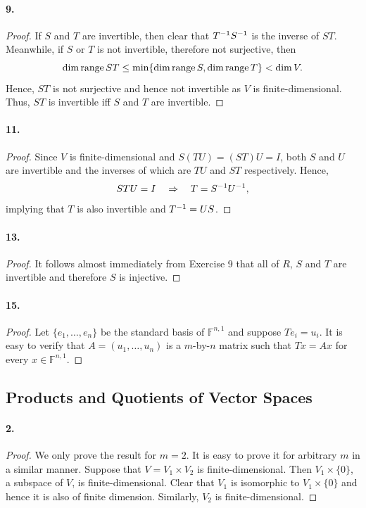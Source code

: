   \paragraph{9.}
  \begin{proof}
    If $S$ and $T$ are invertible, then clear that $T^{-1} S^{-1}$ is the inverse
    of $ST$. Meanwhile, if $S$ or $T$ is not invertible, therefore not 
    surjective, then 
    \[
      \dim\operatorname{range} ST\le\min\{\dim\operatorname{range} S,\dim\operatorname{range} T\}<\dim V.
    \]
    Hence, $ST$ is not surjective and hence not invertible as $V$ is 
    finite-dimensional. Thus, $ST$ is invertible iff $S$ and $T$ are invertible.
  \end{proof}

  \paragraph{11.}
  \begin{proof}
    Since $V$ is finite-dimensional and $S(TU)=(ST)U=I$, both $S$ and $U$ are 
    invertible and the inverses of which are $TU$ and $ST$ respectively. Hence,
    \[
      STU=I \quad\Rightarrow\quad T = S^{-1} U^{-1},
    \]
    implying that $T$ is also invertible and $T^{-1} = US$.
  \end{proof}

  \paragraph{13.}
  \begin{proof}
    It follows almost immediately from Exercise 9 that all of $R$, $S$ and $T$
    are invertible and therefore $S$ is injective.
  \end{proof}

  \paragraph{15.}
  \begin{proof}
    Let $\{e_1,\dots,e_n\}$ be the standard basis of $\mathbb{F}^{n,1}$ and 
    suppose $Te_i = u_i$. It is easy to verify that $A=(u_1, \dots, u_n)$ is a 
    $m$-by-$n$ matrix such that $Tx=Ax$ for every $x\in\mathbb{F}^{n,1}$.
  \end{proof}

\subsection{Products and Quotients of Vector Spaces}
  \paragraph{2.}
  \begin{proof}
    We only prove the result for $m=2$. It is easy to prove it for arbitrary $m$
    in a similar manner. Suppose that $V=V_1\times V_2$ is finite-dimensional. 
    Then $V_1\times\{0\}$, a subspace of $V$, is finite-dimensional. Clear that 
    $V_1$ is isomorphic to $V_1\times \{0\}$ and hence it is also of finite 
    dimension. Similarly, $V_2$ is finite-dimensional. 
  \end{proof}

